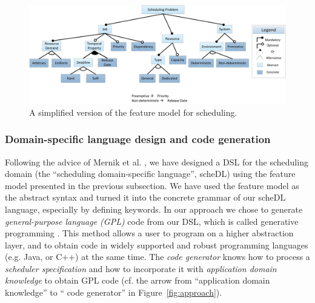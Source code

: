 	\begin{center}
	\begin{figure}
	\includegraphics[width=\textwidth]{chapteroce/images/features.pdf}
	\caption{A simplified version of the feature model for scheduling.}
	\label{fig:feature}
	\end{figure}
	\end{center}
	\subsubsection{Domain-specific language design and code generation}
	Following the advice of Mernik et al. \cite{Mernik2005}, we have designed a DSL for the scheduling domain (the ``scheduling domain-specific language'', \textsf{scheDL}) using the feature 
	model presented in the previous subsection. We have used the feature model as
	the abstract syntax and turned it into the concrete grammar of our \textsf{scheDL} language, especially by defining keywords.
	In our approach we chose to generate \emph{general-purpose language (GPL)} code from our DSL, which is called
	generative programming \cite{Czarnecki:overview}.
	This method allows a user to
	program on a higher abstraction layer, and to obtain code in widely supported and robust programming languages (e.g. Java, or C++) at the same time. The \emph{code generator} knows how to process a \emph{scheduler specification} and
	how to incorporate it with \emph{application domain knowledge} to obtain GPL code (cf. the arrow from ``application domain knowledge'' to `` code generator'' in Figure~\ref{fig:approach}).
	
